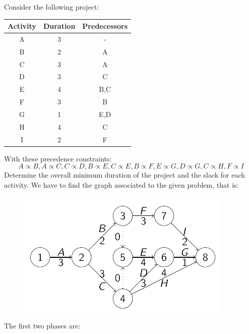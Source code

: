 \documentclass[12pt, a4paper]{report}
\newtheorem[style=M,bodystyle=\normalfont]{proposition}{Proposition}
\newtheorem[style=M,bodystyle=\normalfont]{theorem}{Theorem}
\newtheorem[style=M,bodystyle=\normalfont]{corollary}{Corollary}
\newtheorem[style=M,bodystyle=\normalfont]{lemma}{Lemma}
\newtheorem[style=M,bodystyle=\normalfont]{definition}{Definition}
\begin{document}
    \begin{example}
        Consider the following project: 
        \begin{table}[H]
            \centering
            \begin{tabular}{ccc}
            \hline
            \textbf{Activity} & \textbf{Duration} & \textbf{Predecessors} \\ \hline
            A                 & 3                 & -                     \\
            B                 & 2                 & A                     \\
            C                 & 3                 & A                     \\
            D                 & 3                 & C                     \\
            E                 & 4                 & B,C                   \\
            F                 & 3                 & B                     \\
            G                 & 1                 & E,D                   \\
            H                 & 4                 & C                     \\
            I                 & 2                 & F                     \\ \hline
            \end{tabular}
        \end{table}
        With these precedence constraints: 
        \[A \varpropto B,A \varpropto C,C \varpropto D,B \varpropto E, C \varpropto E,B \varpropto F,E \varpropto G,D \varpropto G,C \varpropto H,F \varpropto I\]
        Determine the overall minimum duration of the project and the slack for each activity. We have to find the graph associated to the given problem, that is: 
        \begin{figure}[H]
            \centering
            \includegraphics[width=0.5\linewidth]{images/eproject.png}
        \end{figure}
        The first two phases are: 

\end{example}
\end{document}
